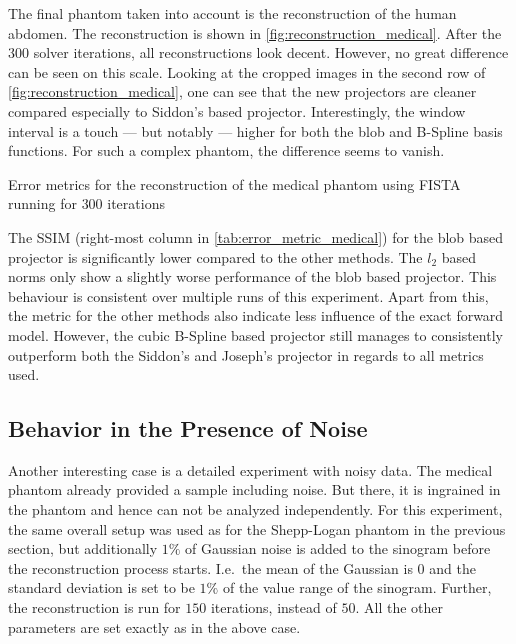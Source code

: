 The final phantom taken into account is the reconstruction of the human abdomen. The reconstruction
is shown in \autoref{fig:reconstruction_medical}. After the \(300\) solver iterations, all
reconstructions look decent. However, no great difference can be seen on this scale. Looking at the
cropped images in the second row of \autoref{fig:reconstruction_medical}, one can see that the new
projectors are cleaner compared especially to Siddon's based projector. Interestingly, the window
interval is a touch --- but notably --- higher for both the blob and B-Spline basis functions. For
such a complex phantom, the difference seems to vanish.

\begin{table}[h]%
	\centering
	\caption{Error metrics for the reconstruction of the medical phantom using FISTA running for
		\(300\) iterations}%
	\label{tab:error_metric_medical}
\end{table}

The \gls{SSIM} (right-most column in \autoref{tab:error_metric_medical}) for the blob based
projector is significantly lower compared to the other methods. The \(l_2\) based norms only show a
slightly worse performance of the blob based projector. This behaviour is consistent over multiple
runs of this experiment. Apart from this, the metric for the other methods also indicate less
influence of the exact forward model. However, the cubic B-Spline based projector still manages to
consistently outperform both the Siddon's and Joseph's projector in regards to all metrics used.

\subsection{Behavior in the Presence of Noise}

Another interesting case is a detailed experiment with noisy data. The medical phantom already
provided a sample including noise. But there, it is ingrained in the phantom and hence can not be
analyzed independently. For this experiment, the same overall setup was used as for the Shepp-Logan
phantom in the previous section, but additionally \(1\%\) of Gaussian noise is added to the sinogram
before the reconstruction process starts. I.e.\ the mean of the Gaussian is \(0\) and the standard
deviation is set to be \(1\%\) of the value range of the sinogram. Further, the reconstruction is
run for \(150\) iterations, instead of \(50\). All the other parameters are set exactly as in the
above case.

